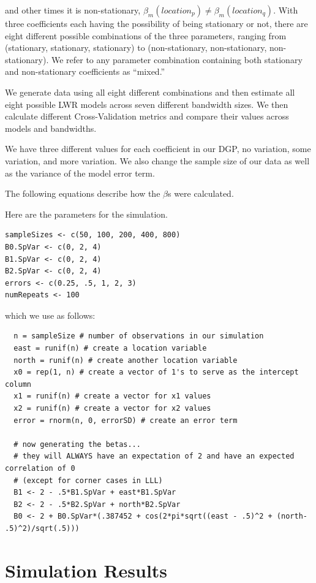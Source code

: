 \documentclass{article}\usepackage[]{graphicx}\usepackage[]{color}
\begin{document}
and other times it is non-stationary, $\beta _m (location_p) \neq \beta _m (location_q)$. With three coefficients each having the possibility of being stationary or not, there are eight different possible combinations of the three parameters, ranging from (stationary, stationary, stationary) to (non-stationary, non-stationary, non-stationary). We refer to any parameter combination containing both stationary and non-stationary coefficients as ``mixed.''

We generate data using all eight different combinations and then estimate all eight possible LWR models across seven different bandwidth sizes. We then calculate different Cross-Validation metrics and compare their values across models and bandwidths. 

We have three different values for each coefficient in our DGP, no variation, some variation, and more variation. We also change the sample size of our data as well as the variance of the model error term.

The following equations describe how the $\beta$s were calculated.





Here are the parameters for the simulation.
\begin{verbatim}
sampleSizes <- c(50, 100, 200, 400, 800) 
B0.SpVar <- c(0, 2, 4)  
B1.SpVar <- c(0, 2, 4) 
B2.SpVar <- c(0, 2, 4) 
errors <- c(0.25, .5, 1, 2, 3)
numRepeats <- 100
\end{verbatim}

which we use as follows:

\begin{verbatim}
  n = sampleSize # number of observations in our simulation
  east = runif(n) # create a location variable
  north = runif(n) # create another location variable
  x0 = rep(1, n) # create a vector of 1's to serve as the intercept column
  x1 = runif(n) # create a vector for x1 values
  x2 = runif(n) # create a vector for x2 values
  error = rnorm(n, 0, errorSD) # create an error term
  
  # now generating the betas...
  # they will ALWAYS have an expectation of 2 and have an expected correlation of 0 
  # (except for corner cases in LLL)  
  B1 <- 2 - .5*B1.SpVar + east*B1.SpVar
  B2 <- 2 - .5*B2.SpVar + north*B2.SpVar
  B0 <- 2 + B0.SpVar*(.387452 + cos(2*pi*sqrt((east - .5)^2 + (north- .5)^2)/sqrt(.5)))
\end{verbatim}

\section{Simulation Results}
\end{document}
